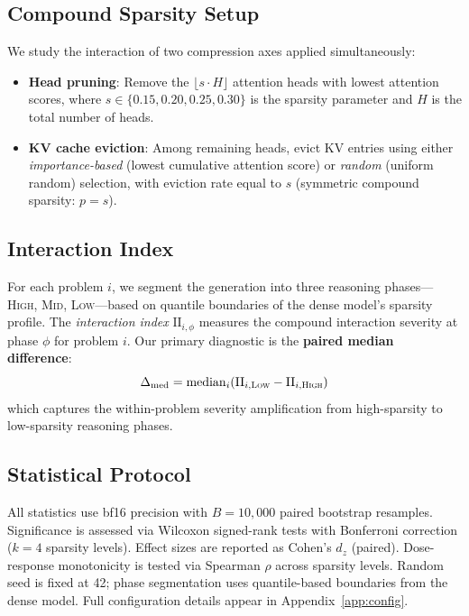 \documentclass[11pt,a4paper]{article}
\begin{document}
\subsection{Compound Sparsity Setup}
We study the interaction of two compression axes applied simultaneously:
\begin{itemize}
\item \textbf{Head pruning}: Remove the $\lfloor s \cdot H \rfloor$ attention heads with lowest attention scores, where $s \in \{0.15, 0.20, 0.25, 0.30\}$ is the sparsity parameter and $H$ is the total number of heads.
\item \textbf{KV cache eviction}: Among remaining heads, evict KV entries using either \emph{importance-based} (lowest cumulative attention score) or \emph{random} (uniform random) selection, with eviction rate equal to $s$ (symmetric compound sparsity: $p = s$).
\end{itemize}

\subsection{Interaction Index}
For each problem $i$, we segment the generation into three reasoning phases---\textsc{High}, \textsc{Mid}, \textsc{Low}---based on quantile boundaries of the dense model's sparsity profile.
The \emph{interaction index} $\mathrm{II}_{i,\phi}$ measures the compound interaction severity at phase $\phi$ for problem $i$.
Our primary diagnostic is the \textbf{paired median difference}:
\begin{equation}
\Delta_{\mathrm{med}} = \mathrm{median}_i\!\left(\mathrm{II}_{i,\textsc{Low}} - \mathrm{II}_{i,\textsc{High}}\right)
\label{eq:median_diff}
\end{equation}
which captures the within-problem severity amplification from high-sparsity to low-sparsity reasoning phases.

\subsection{Statistical Protocol}
All statistics use bf16 precision with $B = 10{,}000$ paired bootstrap resamples.
Significance is assessed via Wilcoxon signed-rank tests with Bonferroni correction ($k = 4$ sparsity levels).
Effect sizes are reported as Cohen's $d_z$ (paired).
Dose-response monotonicity is tested via Spearman $\rho$ across sparsity levels.
Random seed is fixed at 42; phase segmentation uses quantile-based boundaries from the dense model.
Full configuration details appear in Appendix~\ref{app:config}.
\end{document}
